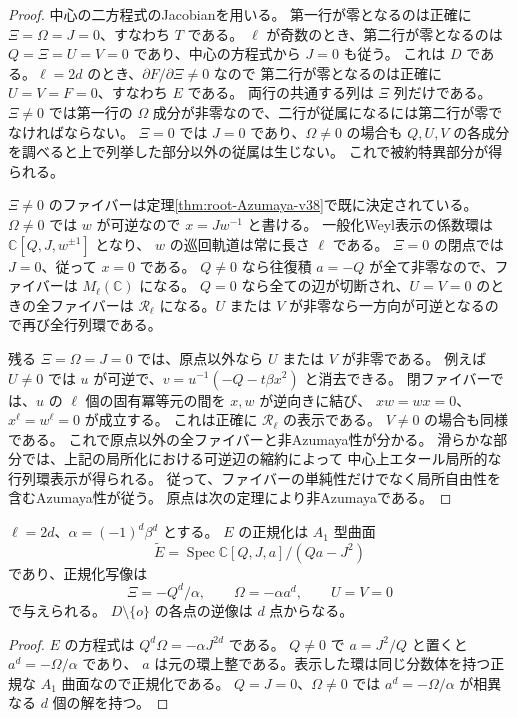 \begin{proof}
中心の二方程式のJacobianを用いる。
第一行が零となるのは正確に $\Xi=\Omega=J=0$、すなわち $T$ である。
$\ell$ が奇数のとき、第二行が零となるのは
$Q=\Xi=U=V=0$ であり、中心の方程式から $J=0$ も従う。
これは $D$ である。$\ell=2d$ のとき、$\partial F/\partial\Xi\ne0$ なので
第二行が零となるのは正確に $U=V=F=0$、すなわち $E$ である。
両行の共通する列は $\Xi$ 列だけである。
$\Xi\ne0$ では第一行の $\Omega$ 成分が非零なので、二行が従属になるには第二行が零でなければならない。
$\Xi=0$ では $J=0$ であり、$\Omega\ne0$ の場合も
$Q,U,V$ の各成分を調べると上で列挙した部分以外の従属は生じない。
これで被約特異部分が得られる。

$\Xi\ne0$ のファイバーは定理\ref{thm:root-Azumaya-v38}で既に決定されている。
$\Omega\ne0$ では $w$ が可逆なので $x=Jw^{-1}$ と書ける。
一般化Weyl表示の係数環は $\mathbb C[Q,J,w^{\pm1}]$ となり、
$w$ の巡回軌道は常に長さ $\ell$ である。
$\Xi=0$ の閉点では $J=0$、従って $x=0$ である。
$Q\ne0$ なら往復積 $a=-Q$ が全て非零なので、ファイバーは $M_\ell(\mathbb C)$ になる。
$Q=0$ なら全ての辺が切断され、$U=V=0$ のときの全ファイバーは
$\mathcal R_\ell$ になる。$U$ または $V$ が非零なら一方向が可逆となるので再び全行列環である。

残る $\Xi=\Omega=J=0$ では、原点以外なら $U$ または $V$ が非零である。
例えば $U\ne0$ では $u$ が可逆で、$v=u^{-1}(-Q-t\beta x^2)$ と消去できる。
閉ファイバーでは、$u$ の $\ell$ 個の固有冪等元の間を $x,w$ が逆向きに結び、
$xw=wx=0$、$x^\ell=w^\ell=0$ が成立する。
これは正確に $\mathcal R_\ell$ の表示である。
$V\ne0$ の場合も同様である。
これで原点以外の全ファイバーと非Azumaya性が分かる。
滑らかな部分では、上記の局所化における可逆辺の縮約によって
中心上エタール局所的な行列環表示が得られる。
従って、ファイバーの単純性だけでなく局所自由性を含むAzumaya性が従う。
原点は次の定理により非Azumayaである。
\end{proof}

\begin{proposition}[偶数の場合の特異成分の正規化]
\label{prop:global-singular-normalization-v40}
$\ell=2d$、$\alpha=(-1)^d\beta^d$ とする。
$E$ の正規化は $A_1$ 型曲面
\[
 \widetilde E=\operatorname{Spec}\mathbb C[Q,J,a]/(Qa-J^2)
\]
であり、正規化写像は
\[
 \Xi=-Q^d/\alpha,\qquad \Omega=-\alpha a^d,\qquad U=V=0
\]
で与えられる。
$D\setminus\{o\}$ の各点の逆像は $d$ 点からなる。
\end{proposition}

\begin{proof}
$E$ の方程式は $Q^d\Omega=-\alpha J^{2d}$ である。
$Q\ne0$ で $a=J^2/Q$ と置くと $a^d=-\Omega/\alpha$ であり、
$a$ は元の環上整である。表示した環は同じ分数体を持つ正規な $A_1$ 曲面なので正規化である。
$Q=J=0$、$\Omega\ne0$ では $a^d=-\Omega/\alpha$ が相異なる $d$ 個の解を持つ。
\end{proof}

